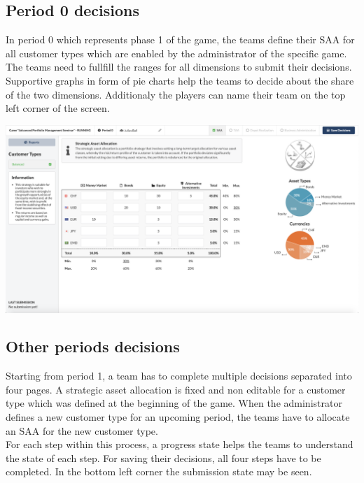\subsection{Period 0 decisions}
In period 0 which represents phase 1 of the game, the teams define their SAA for all customer types which are enabled by the administrator of the specific game. The teams need to fullfill the ranges for all dimensions to submit their decisions. Supportive graphs in form of pie charts help the teams to decide about the share of the two dimensions. Additionaly the players can name their team on the top left corner of the screen.
\begin{center}
  \includegraphics[scale=0.2]{img/application-overview/teams/02_period_zero_decisions.png}
\end{center}

\subsection{Other periods decisions}
Starting from period 1, a team has to complete multiple decisions separated into four pages. A strategic asset allocation is fixed and non editable for a customer type which was defined at the beginning of the game. When the administrator defines a new customer type for an upcoming period, the teams have to allocate an SAA for the new customer type.\\

For each step within this process, a progress state helps the teams to understand the state of each step. For saving their decisions, all four steps have to be completed. In the bottom left corner the submission state may be seen.

